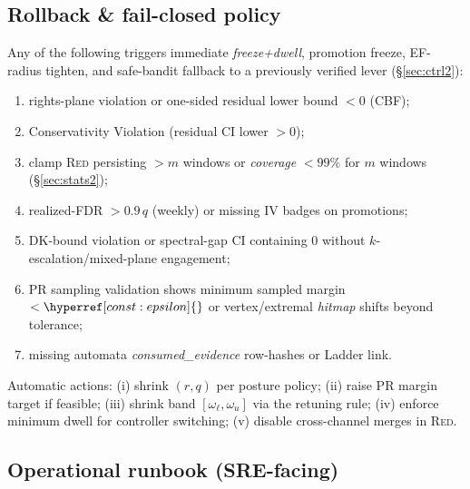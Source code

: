 \documentclass[10pt]{article}
\newcommand{\cutq}{q}
\newcommand{\constref}[1]{\hyperref[const:#1]{\ensuremath{\csname constsym#1\endcsname}}}
\begin{document}
\subsection*{Rollback \& fail-closed policy}
Any of the following triggers immediate \emph{freeze+dwell}, promotion freeze, EF-radius tighten, and safe-bandit fallback to a previously verified lever (\S\ref{sec:ctrl2}):
\begin{enumerate}[leftmargin=*]
\item rights-plane violation or one-sided residual lower bound $<0$ (CBF); 
\item \textsf{Conservativity Violation} (residual CI lower $>0$);
\item clamp \textsc{Red} persisting $>m$ windows or \emph{coverage} $<99\%$ for $m$ windows (\S\ref{sec:stats2});
\item realized-FDR $>0.9\,\cutq$ (weekly) or missing IV badges on promotions;
\item DK-bound violation or spectral-gap CI containing $0$ without $k$-escalation/mixed-plane engagement;
\item PR sampling validation shows minimum sampled margin $<\constref{epsilon}$ or vertex/extremal \emph{hitmap} shifts beyond tolerance;
\item missing automata \emph{consumed\_evidence} row-hashes or Ladder link.
\end{enumerate}
Automatic actions: (i) shrink $(r,q)$ per posture policy; (ii) raise PR margin target if feasible; (iii) shrink band $[\omega_\ell,\omega_u]$ via the retuning rule; (iv) enforce minimum dwell for controller switching; (v) disable cross-channel merges in \textsc{Red}.

\subsection*{Operational runbook (SRE-facing)}
\end{document}
